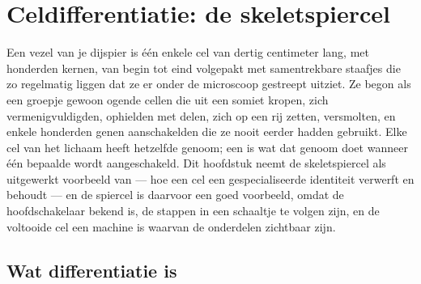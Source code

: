 \chapter{Celdifferentiatie: de skeletspiercel}\label{ch:b2:cell-differentiation}

Een vezel van je dijspier is één enkele cel van dertig centimeter lang,
met honderden kernen, van begin tot eind volgepakt met samentrekbare
staafjes die zo regelmatig liggen dat ze er onder de microscoop gestreept
uitziet. Ze begon als een groepje gewoon ogende cellen die uit een somiet
kropen, zich vermenigvuldigden, ophielden met delen, zich op een rij
zetten, versmolten, en enkele honderden genen aanschakelden die ze nooit
eerder hadden gebruikt. Elke cel van het lichaam heeft hetzelfde genoom;
een  is wat dat genoom doet wanneer één bepaalde
 wordt aangeschakeld. Dit hoofdstuk neemt de
skeletspiercel als uitgewerkt voorbeeld van \emph{} --- hoe
een cel een gespecialiseerde identiteit verwerft en behoudt --- en de
spiercel is daarvoor een goed voorbeeld, omdat de hoofdschakelaar bekend is,
de stappen in een schaaltje te volgen zijn, en de voltooide cel een
machine is waarvan de onderdelen zichtbaar zijn.

\section{Wat differentiatie is}

